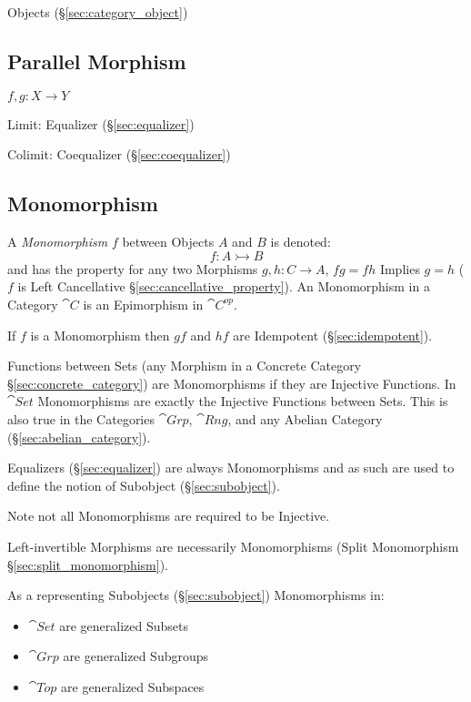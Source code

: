 Objects (\S\ref{sec:category_object})



\subsection{Parallel Morphism}\label{sec:parallel_morphism}

$f,g : X \rightarrow Y$

Limit: Equalizer (\S\ref{sec:equalizer})

Colimit: Coequalizer (\S\ref{sec:coequalizer})



\subsection{Monomorphism}\label{sec:monomorphism}

A \emph{Monomorphism} $f$ between Objects $A$ and $B$ is denoted:
\[
  f : A \rightarrowtail B
\]
and has the property for any two Morphisms $g, h : C \rightarrow A$,
$fg = fh$ Implies $g = h$ ($f$ is Left Cancellative
\S\ref{sec:cancellative_property}). An Monomorphism in a Category
$\cat{C}$ is an Epimorphism in $\cat{C^{op}}$.

If $f$ is a Monomorphism then $gf$ and $hf$ are Idempotent
(\S\ref{sec:idempotent}). %

Functions between Sets (any Morphism in a Concrete Category
\S\ref{sec:concrete_category}) are Monomorphisms if they are Injective
Functions. In $\cat{Set}$ Monomorphisms are exactly the Injective
Functions between Sets. This is also true in the Categories
$\cat{Grp}$, $\cat{Rng}$, and any Abelian Category
(\S\ref{sec:abelian_category}).

Equalizers (\S\ref{sec:equalizer}) are always Monomorphisms and as
such are used to define the notion of Subobject
(\S\ref{sec:subobject}).

\fist Note not all Monomorphisms are required to be Injective.

Left-invertible Morphisms are necessarily Monomorphisms (Split
Monomorphism \S\ref{sec:split_monomorphism}).

As a representing Subobjects (\S\ref{sec:subobject}) Monomorphisms in:
\begin{itemize}
  \item $\cat{Set}$ are generalized Subsets
  \item $\cat{Grp}$ are generalized Subgroups
  \item $\cat{Top}$ are generalized Subspaces
\end{itemize}



